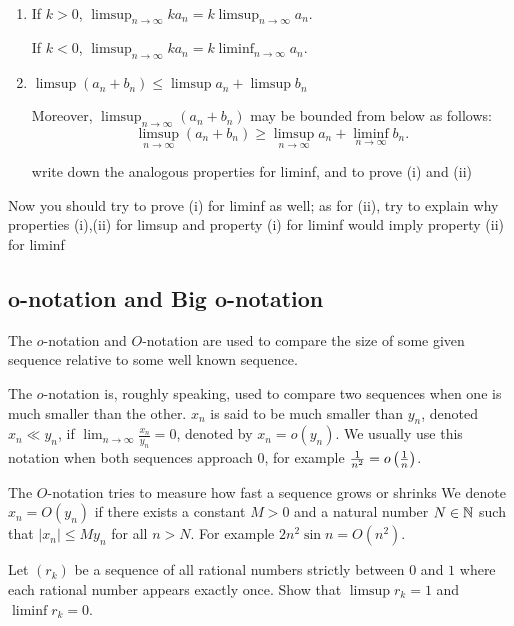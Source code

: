 \begin{lemma} \
\begin{enumerate}[label=(\roman*)]
\item If $k>0$, $\displaystyle\limsup_{n\to\infty}ka_n=k\limsup_{n\to\infty}a_n$.

If $k<0$, $\displaystyle\limsup_{n\to\infty}ka_n=k\liminf_{n\to\infty}a_n$.

\item $\displaystyle\limsup(a_n+b_n)\le\limsup a_n+\limsup b_n$

Moreover, $\displaystyle\limsup_{n\to\infty}(a_n+b_n)$ may be bounded from below as follows:
\[ \limsup_{n\to\infty}(a_n+b_n)\ge\limsup_{n\to\infty}a_n+\liminf_{n\to\infty}b_n.\]

write down the analogous properties for liminf, and to prove (i) and (ii)
\end{enumerate}
\end{lemma}

Now you should try to prove (i) for liminf as well; as for (ii), try to explain why properties (i),(ii) for limsup and property (i) for liminf would imply property (ii) for liminf
\pagebreak

\subsection{o-notation and Big o-notation}
The $o$-notation and $O$-notation are used to compare the size of some given sequence relative to some well known sequence.

The $o$-notation is, roughly speaking, used to compare two sequences when one is much smaller than the other. $x_n$ is said to be much smaller than $y_n$, denoted $x_n\ll y_n$, if $\lim_{n\to\infty}\frac{x_n}{y_n}=0$, denoted by $x_n=o(y_n)$.
We usually use this notation when both sequences approach 0, for example $\frac{1}{n^2}=o\left(\frac{1}{n}\right)$.

The $O$-notation tries to measure how fast a sequence grows or shrinks
We denote $x_n=O(y_n)$ if there exists a constant $M>0$ and a natural number $N\in\mathbb N$ such that $|x_n|\le My_n$ for all $n>N$. 
For example $2n^2\sin n=O(n^2)$.

\begin{example}
Let $(r_k)$ be a sequence of all rational numbers strictly between $0$ and $1$ where each rational number appears exactly once. Show that $\limsup r_k=1$ and $\liminf r_k=0$.
\end{example}
\pagebreak

